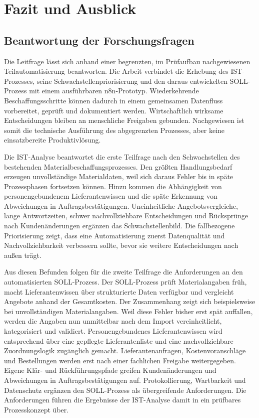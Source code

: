 \documentclass[a4paper,12pt]{article}
\begin{document}
\clearpage
\section{Fazit und Ausblick}
\subsection{Beantwortung der Forschungsfragen}
Die Leitfrage lässt sich anhand einer begrenzten, im Prüfaufbau nachgewiesenen Teilautomatisierung beantworten. Die Arbeit verbindet die Erhebung des IST-Prozesses, seine Schwachstellenpriorisierung und den daraus entwickelten SOLL-Prozess mit einem ausführbaren n8n-Prototyp. Wiederkehrende Beschaffungsschritte können dadurch in einem gemeinsamen Datenfluss vorbereitet, geprüft und dokumentiert werden. Wirtschaftlich wirksame Entscheidungen bleiben an menschliche Freigaben gebunden. Nachgewiesen ist somit die technische Ausführung des abgegrenzten Prozesses, aber keine einsatzbereite Produktivlösung.

Die IST-Analyse beantwortet die erste Teilfrage nach den Schwachstellen des bestehenden Materialbeschaffungsprozesses. Den größten Handlungsbedarf erzeugen unvollständige Materialdaten, weil sich daraus Fehler bis in späte Prozessphasen fortsetzen können. Hinzu kommen die Abhängigkeit von personengebundenem Lieferantenwissen und die späte Erkennung von Abweichungen in Auftragsbestätigungen. Uneinheitliche Angebotsvergleiche, lange Antwortzeiten, schwer nachvollziehbare Entscheidungen und Rücksprünge nach Kundenänderungen ergänzen das Schwachstellenbild. Die fallbezogene Priorisierung zeigt, dass eine Automatisierung zuerst Datenqualität und Nachvollziehbarkeit verbessern sollte, bevor sie weitere Entscheidungen nach außen trägt.

Aus diesen Befunden folgen für die zweite Teilfrage die Anforderungen an den automatisierten SOLL-Prozess. Der SOLL-Prozess prüft Materialangaben früh, macht Lieferantenwissen über strukturierte Daten verfügbar und vergleicht Angebote anhand der Gesamtkosten. Der Zusammenhang zeigt sich beispielsweise bei unvollständigen Materialangaben. Weil diese Fehler bisher erst spät auffallen, werden die Angaben nun unmittelbar nach dem Import vereinheitlicht, kategorisiert und validiert. Personengebundenes Lieferantenwissen wird entsprechend über eine gepflegte Lieferantenliste und eine nachvollziehbare Zuordnungslogik zugänglich gemacht. Lieferantenanfragen, Kostenvoranschläge und Bestellungen werden erst nach einer fachlichen Freigabe weitergegeben. Eigene Klär- und Rückführungspfade greifen Kundenänderungen und Abweichungen in Auftragsbestätigungen auf. Protokollierung, Wartbarkeit und Datenschutz ergänzen den SOLL-Prozess als übergreifende Anforderungen. Die Anforderungen führen die Ergebnisse der IST-Analyse damit in ein prüfbares Prozesskonzept über.
\end{document}
